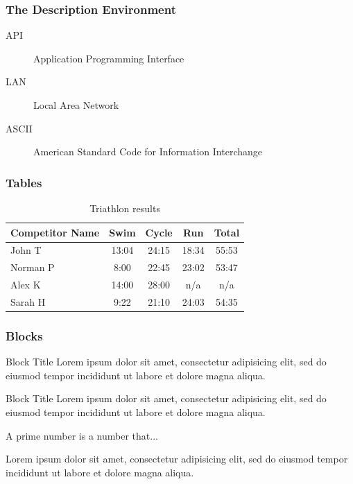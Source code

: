 \documentclass{beamer}
\begin{document}
\begin{frame}
  \frametitle{The Description Environment}
  \begin{description}
    \item[API] Application Programming Interface
    \item[LAN] Local Area Network
    \item[ASCII] American Standard Code for Information Interchange
  \end{description}
\end{frame}

\begin{frame}
  \frametitle{Tables}
  \begin{table}
    \begin{tabular}{l | c | c | c | c }
    Competitor Name & Swim & Cycle & Run & Total \\
    \hline \hline
    John T & 13:04 & 24:15 & 18:34 & 55:53 \\ 
    Norman P & 8:00 & 22:45 & 23:02 & 53:47\\
    Alex K & 14:00 & 28:00 & n/a & n/a\\
    Sarah H & 9:22 & 21:10 & 24:03 & 54:35 
    \end{tabular}
    \caption{Triathlon results}
    \end{table}
\end{frame}

\begin{frame}
  \frametitle{Blocks}
  \begin{block}{Block Title}
    Lorem ipsum dolor sit amet, consectetur adipisicing elit, 
    sed do eiusmod tempor incididunt ut labore et 
    dolore magna aliqua.
  \end{block}

  \begin{alertblock}{Block Title}
    Lorem ipsum dolor sit amet, consectetur adipisicing elit, 
    sed do eiusmod tempor incididunt ut labore et 
    dolore magna aliqua.
  \end{alertblock}

  \begin{definition}
    A prime number is a number that...
  \end{definition}

  \begin{example}
    Lorem ipsum dolor sit amet, consectetur adipisicing elit, 
    sed do eiusmod tempor incididunt ut labore et
    dolore magna aliqua.
  \end{example}
\end{frame}
\end{document}
